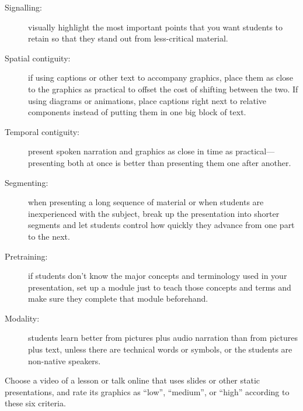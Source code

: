 \begin{description}

  \item[Signalling:] visually highlight the most important points that
    you want students to retain so that they stand out from
    less-critical material.

  \item[Spatial contiguity:] if using captions or other text to
    accompany graphics, place them as close to the graphics as
    practical to offset the cost of shifting between the two. If using
    diagrams or animations, place captions right next to relative
    components instead of putting them in one big block of text.

  \item[Temporal contiguity:] present spoken narration and graphics as
    close in time as practical---presenting both at once is better
    than presenting them one after another.

  \item[Segmenting:] when presenting a long sequence of material or
    when students are inexperienced with the subject, break up the
    presentation into shorter segments and let students control how
    quickly they advance from one part to the next.

  \item[Pretraining:] if students don't know the major concepts and
    terminology used in your presentation, set up a module just to
    teach those concepts and terms and make sure they complete that
    module beforehand.

  \item[Modality:] students learn better from pictures plus audio
    narration than from pictures plus text, unless there are technical
    words or symbols, or the students are non-native speakers.

\end{description}

Choose a video of a lesson or talk online that uses slides or other
static presentations, and rate its graphics as ``low'', ``medium'', or
``high'' according to these six criteria.
